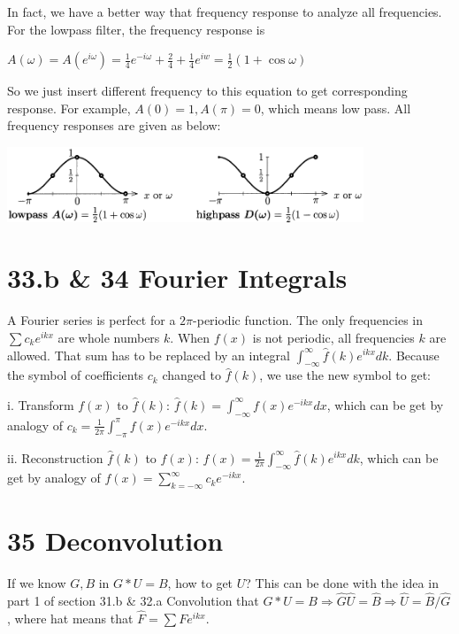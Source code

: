 \documentclass{article}
\newenvironment{nscenter}
{\parskip=0pt\par\nopagebreak\centering}
{\par\noindent\ignorespacesafterend}
\begin{document}
\begin{spacing}{1.5}
In fact, we have a better way that frequency response to analyze all frequencies. For the lowpass filter, the frequency response is 
\begin{nscenter}
	$A(\omega)=A(e^{i\omega})=\frac{1}{4}e^{-i\omega} + \frac{2}{4} + \frac{1}{4}e^{iw} = \frac{1}{2}(1+\cos \omega)$
\end{nscenter}
So we just insert different frequency to this equation to get corresponding response. For example, $A(0)=1, A(\pi)=0$, which means low pass. All frequency responses are given as below:
\\\begin{nscenter}
	\includegraphics[width=0.8\textwidth]{lowpass_and_highpass.png} \\ 
\end{nscenter}

\section*{33.b \& 34 Fourier Integrals}
A Fourier series is perfect for a $2\pi$-periodic function. The only frequencies in $\sum c_ke^{ikx}$ are whole numbers $k$. When $f(x)$ is not periodic, all frequencies $k$ are allowed. That sum has to be replaced by an integral $\int_{-\infty }^{\infty}\hat f (k) e^{ikx} dk$. Because the symbol of coefficients $c_k$ changed to $\hat f(k)$, we use the new symbol to get:

i. Transform $f(x)$ to $\hat f(k)$: $\hat f(k)=\int_{-\infty }^{\infty} f (x) e^{-ikx} dx$, which can be get by analogy of $c_k = \frac{1}{2\pi}\int_{-\pi}^{\pi}f(x)e^{-ikx}dx$.

ii. Reconstruction $\hat f (k)$ to $f(x)$: $f(x)=\frac{1}{2\pi}\int_{-\infty }^{\infty}\hat f (k) e^{ikx} dk$, which can be get by analogy of $f(x)=\sum_{k=-\infty}^{\infty}c_ke^{-ikx}$.

\section*{35 Deconvolution}
If we know $G, B$ in $G * U = B$, how to get $U$? This can be done with the idea in part 1 of section 31.b \& 32.a Convolution  that $G *U=B \Rightarrow \hat G \hat U = \hat B \Rightarrow \hat U = \hat B / \hat G$, where hat means that $\hat F = \sum Fe^{ikx}$.


\end{spacing}
\end{document}
